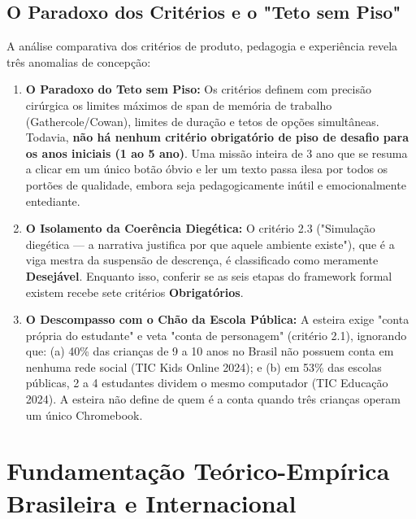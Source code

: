 \documentclass[11pt,a4paper]{article}
\begin{document}
\subsection{O Paradoxo dos Crit\'erios e o "Teto sem Piso"}

A an\'alise comparativa dos crit\'erios de produto, pedagogia e experi\^encia revela tr\^es anomalias de concep\c{c}\~ao:

\begin{enumerate}
    \item \textbf{O Paradoxo do Teto sem Piso:} Os crit\'erios definem com precis\~ao cir\'urgica os limites m\'aximos de span de mem\'oria de trabalho (Gathercole/Cowan), limites de dura\c{c}\~ao e tetos de op\c{c}\~oes simult\^aneas. Todavia, \textbf{n\~ao h\'a nenhum crit\'erio obrigat\'orio de piso de desafio para os anos iniciais (1\textordmasculine{} ao 5\textordmasculine{} ano)}. Uma miss\~ao inteira de 3\textordmasculine{} ano que se resuma a clicar em um \'unico bot\~ao \'obvio e ler um texto passa ilesa por todos os port\~oes de qualidade, embora seja pedagogicamente in\'util e emocionalmente entediante.
    \item \textbf{O Isolamento da Coer\^encia Dieg\'etica:} O crit\'erio 2.3 ("Simula\c{c}\~ao dieg\'etica --- a narrativa justifica por que aquele ambiente existe"), que \'e a viga mestra da suspens\~ao de descren\c{c}a, \'e classificado como meramente \textbf{Desej\'avel}. Enquanto isso, conferir se as seis etapas do framework formal existem recebe sete crit\'erios \textbf{Obrigat\'orios}.
    \item \textbf{O Descompasso com o Ch\~ao da Escola P\'ublica:} A esteira exige "conta pr\'opria do estudante" e veta "conta de personagem" (crit\'erio 2.1), ignorando que: (a) 40\% das crian\c{c}as de 9 a 10 anos no Brasil n\~ao possuem conta em nenhuma rede social (TIC Kids Online 2024); e (b) em 53\% das escolas p\'ublicas, 2 a 4 estudantes dividem o mesmo computador (TIC Educa\c{c}\~ao 2024). A esteira n\~ao define de quem \'e a conta quando tr\^es crian\c{c}as operam um \'unico Chromebook.
\end{enumerate}

\section{Fundamenta\c{c}\~ao Te\'orico-Emp\'irica Brasileira e Internacional}
\end{document}
